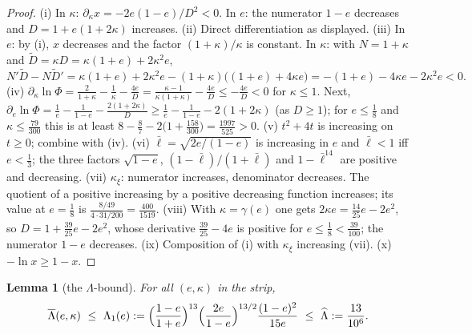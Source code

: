 \documentclass[11pt]{article}
\newtheorem{lemma}{Lemma}[section]
\theoremstyle{remark}
\newcommand{\kxi}{\kappa_\xi}
\newcommand{\lbar}{\bar\ell}
\begin{document}
\begin{proof}
(i) In $\kappa$: $\partial_\kappa x=-2e(1-e)/D^2<0$.  In $e$: the numerator
$1-e$ decreases and $D=1+e(1+2\kappa)$ increases.
(ii) Direct differentiation as displayed.
(iii) In $e$: by (i), $x$ decreases and the factor $(1+\kappa)/\kappa$ is
constant.  In $\kappa$: with $N=1+\kappa$ and $\tilde D=\kappa D
=\kappa(1+e)+2\kappa^2e$,
\[
        N'\tilde D-N\tilde D'
        =\kappa(1+e)+2\kappa^2e-(1+\kappa)\bigl((1+e)+4\kappa e\bigr)
        =-(1+e)-4\kappa e-2\kappa^2e<0 .
\]
(iv) $\partial_\kappa\ln\Phi=\frac2{1+\kappa}-\frac1\kappa-\frac{4e}D
=\frac{\kappa-1}{\kappa(1+\kappa)}-\frac{4e}D\le-\frac{4e}D<0$ for
$\kappa\le1$.  Next,
$\partial_e\ln\Phi=\frac1e-\frac1{1-e}-\frac{2(1+2\kappa)}D
\ge\frac1e-\frac1{1-e}-2(1+2\kappa)$ (as $D\ge1$); for $e\le\tfrac18$ and
$\kappa\le\tfrac{79}{300}$ this is at least
$8-\tfrac87-2\bigl(1+\tfrac{158}{300}\bigr)=\tfrac{1997}{525}>0$.
(v) $t^2+4t$ is increasing on $t\ge0$; combine with (iv).
(vi) $\lbar=\sqrt{2e/(1-e)}$ is increasing in $e$ and $\lbar<1$ iff
$e<\tfrac13$; the three factors $\sqrt{1-e}$, $(1-\lbar)/(1+\lbar)$ and
$1-\lbar^{14}$ are positive and decreasing.
(vii) $\kxi$: numerator increases, denominator decreases.  The quotient of
a positive increasing by a positive decreasing function increases; its
value at $e=\tfrac18$ is $\frac{8/49}{4\cdot31/200}=\frac{400}{1519}$.
(viii) With $\kappa=\gamma(e)$ one gets $2\kappa e=\tfrac{14}{25}e-2e^2$,
so $D=1+\tfrac{39}{25}e-2e^2$, whose derivative $\tfrac{39}{25}-4e$ is
positive for $e\le\tfrac18<\tfrac{39}{100}$; the numerator $1-e$ decreases.
(ix) Composition of (i) with $\kxi$ increasing (vii).
(x) $-\ln x\ge1-x$.
\end{proof}

\begin{lemma}[the $\Lambda$-bound]\label{lem:lambda}
For all $(e,\kappa)$ in the strip,
\[
        \overline\Lambda(e,\kappa)\ \le\
        \Lambda_1(e):=\Bigl(\frac{1-e}{1+e}\Bigr)^{13}
        \Bigl(\frac{2e}{1-e}\Bigr)^{13/2}\frac{(1-e)^2}{15e}
        \ \le\ \widehat\Lambda:=\frac{13}{10^6}.
\]
\end{lemma}
\end{document}
